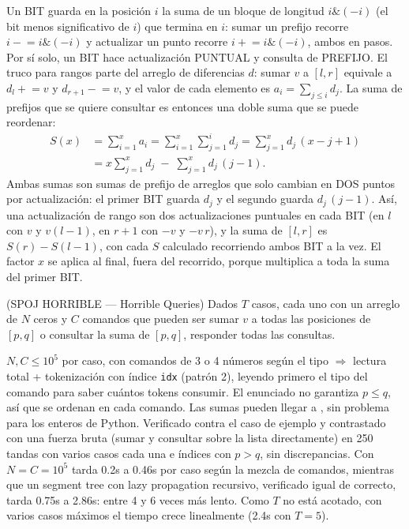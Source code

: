  Un BIT guarda en la posición $i$ la suma de un bloque de longitud $i \mathbin{\&} (-i)$ (el bit menos significativo de $i$) que termina en $i$: sumar un prefijo recorre $i \mathrel{-}= i \mathbin{\&} (-i)$ y actualizar un punto recorre $i \mathrel{+}= i \mathbin{\&} (-i)$, ambos en  pasos. Por sí solo, un BIT hace actualización PUNTUAL y consulta de PREFIJO. El truco para rangos parte del arreglo de diferencias $d$: sumar $v$ a $[l, r]$ equivale a $d_l \mathrel{+}= v$ y $d_{r+1} \mathrel{-}= v$, y el valor de cada elemento es $a_i = \sum_{j \le i} d_j$. La suma de prefijos que se quiere consultar es entonces una doble suma que se puede reordenar:
\begin{align*}
S(x) &= \sum_{i=1}^{x} a_i = \sum_{i=1}^{x}\sum_{j=1}^{i} d_j = \sum_{j=1}^{x} d_j\,(x - j + 1)\\
     &= x\sum_{j=1}^{x} d_j \;-\; \sum_{j=1}^{x} d_j\,(j-1).
\end{align*}
Ambas sumas son sumas de prefijo de arreglos que solo cambian en DOS puntos por actualización: el primer BIT guarda $d_j$ y el segundo guarda $d_j\,(j-1)$. Así, una actualización de rango son dos actualizaciones puntuales en cada BIT (en $l$ con $v$ y $v(l-1)$, en $r+1$ con $-v$ y $-v\,r$), y la suma de $[l, r]$ es $S(r) - S(l-1)$, con cada $S$ calculado recorriendo ambos BIT a la vez. El factor $x$ se aplica al final, fuera del recorrido, porque multiplica a toda la suma del primer BIT.~\cite{fenwick1994}


(SPOJ HORRIBLE — Horrible Queries) Dados $T$ casos, cada uno con un arreglo de $N$ ceros y $C$ comandos que pueden ser sumar $v$ a todas las posiciones de $[p, q]$ o consultar la suma de $[p, q]$, responder todas las consultas.

 $N, C \le 10^5$ por caso, con comandos de 3 o 4 números según el tipo $\Rightarrow$ lectura total + tokenización con índice \texttt{idx} (patrón 2), leyendo primero el tipo del comando para saber cuántos tokens consumir. El enunciado no garantiza $p \le q$, así que se ordenan en cada comando. Las sumas pueden llegar a \aprox{}, sin problema para los enteros de Python. Verificado contra el caso de ejemplo y contrastado con una fuerza bruta (sumar y consultar sobre la lista directamente) en 250 tandas con varios casos cada una e índices con $p > q$, sin discrepancias. Con $N = C = 10^5$ tarda \aprox{}0.2s a \aprox{}0.46s por caso según la mezcla de comandos, mientras que un segment tree con lazy propagation recursivo, verificado igual de correcto, tarda \aprox{}0.75s a \aprox{}2.86s: entre 4 y 6 veces más lento. Como $T$ no está acotado, con varios casos máximos el tiempo crece linealmente (\aprox{}2.4s con $T = 5$).

